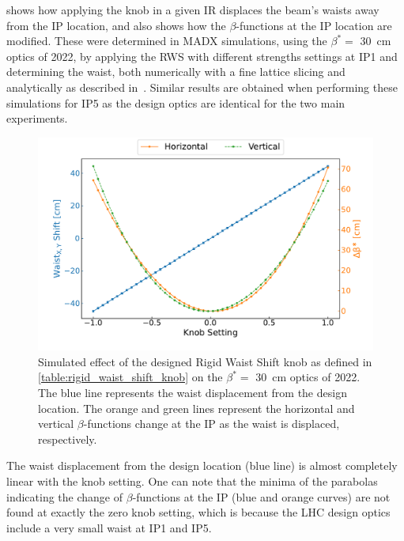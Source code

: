  shows how applying the knob in a given IR displaces the beam's waists away from the IP location, and also shows how the \(\beta\)-functions at the IP location are modified.
These were determined in \gls{MADX} simulations, using the \(\beta^{\ast} =\) \qty{30}{\centi\metre} optics of \num{2022}, by applying the RWS with different strengths settings at IP\num{1} and determining the waist, both numerically with a fine lattice slicing and analytically as described in~\cite{PRAB:Carlier:KModulation_HiLumi}.
Similar results are obtained when performing these simulations for IP\num{5} as the design optics are identical for the two main experiments.

\begin{figure}[!htb]
    \centering
    \includegraphics[width=\textwidth]{Figures/IR_Coupling_Correction/rigid_waist_shift_waist_effect_combined.pdf}
    \caption{Simulated effect of the designed Rigid Waist Shift knob as defined in \cref{table:rigid_waist_shift_knob} on the \(\beta^{\ast} =\) \qty{30}{\centi\metre} optics of \num{2022}. The \textcolor{mplblue}{blue} line represents the waist displacement from the design location. The \textcolor{mplorange}{orange} and \textcolor{mplgreen}{green} lines represent the horizontal and vertical \(\beta\)-functions change at the IP as the waist is displaced, respectively.}
    \label{figure:rigid_waist_shift_knob_effect_on_waist}
\end{figure}

The waist displacement from the design location (\textcolor{mplblue}{blue} line) is almost completely linear with the knob setting.
One can note that the minima of the parabolas indicating the change of \(\beta\)-functions at the IP (\textcolor{mplblue}{blue} and \textcolor{mplorange}{orange} curves) are not found at exactly the zero knob setting, which is because the LHC design optics include a very small waist at IP\num{1} and IP\num{5}.

